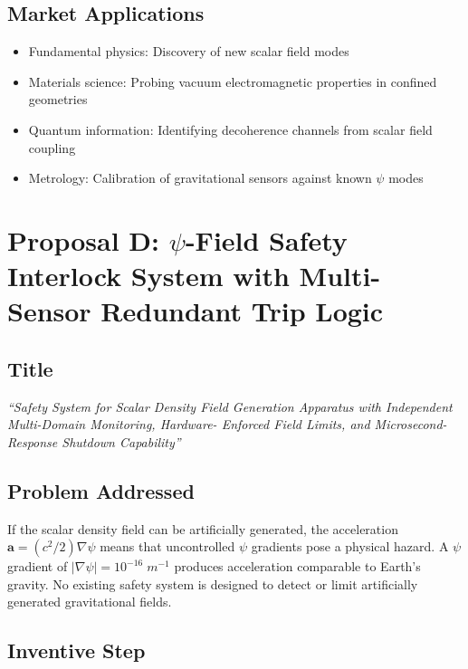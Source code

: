 \documentclass[11pt,a4paper]{article}
\begin{document}
\subsection{Market Applications}

\begin{itemize}[nosep]
\item Fundamental physics: Discovery of new scalar field modes
\item Materials science: Probing vacuum electromagnetic
properties in confined geometries
\item Quantum information: Identifying decoherence channels
from scalar field coupling
\item Metrology: Calibration of gravitational sensors against
known $\psi$ modes
\end{itemize}

\section{Proposal D: $\psi$-Field Safety Interlock System with
Multi-Sensor Redundant Trip Logic}

\subsection{Title}

\textit{``Safety System for Scalar Density Field Generation
Apparatus with Independent Multi-Domain Monitoring, Hardware-
Enforced Field Limits, and Microsecond-Response Shutdown
Capability''}

\subsection{Problem Addressed}

If the scalar density field can be artificially generated, the
acceleration $\mathbf{a} = (c^2/2)\nabla\psi$ means that
uncontrolled $\psi$ gradients pose a physical hazard.  A
$\psi$ gradient of $|\nabla\psi| = 10^{-16}\;\si{m^{-1}}$
produces acceleration comparable to Earth's gravity.
No existing safety system is designed to detect or limit
artificially generated gravitational fields.

\subsection{Inventive Step}
\end{document}
